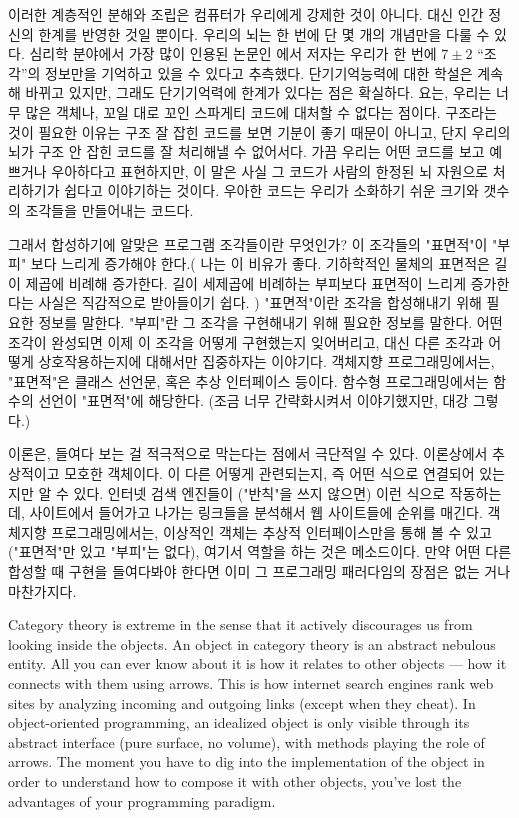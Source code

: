 이러한 계층적인 분해와 조립은 컴퓨터가 우리에게 강제한 것이 아니다.
대신 인간 정신의 한계를 반영한 것일 뿐이다. 우리의 뇌는 한 번에 단 몇 개의 개념만을 다룰 수 있다.
심리학 분야에서 가장 많이 인용된 논문인 
에서 저자는 우리가 한 번에 $7 \pm 2$ ``조각''의 정보만을 기억하고 있을 수 있다고 추측했다.
단기기억능력에 대한 학설은 계속해 바뀌고 있지만, 그래도 단기기억력에 한계가 있다는 점은 확실하다.
요는, 우리는 너무 많은 객체나, 꼬일 대로 꼬인 스파게티 코드에 대처할 수 없다는 점이다.
구조라는 것이 필요한 이유는 구조 잘 잡힌 코드를 보면 기분이 좋기 때문이 아니고,
단지 우리의 뇌가 구조 안 잡힌 코드를 잘 처리해낼 수 없어서다.
가끔 우리는 어떤 코드를 보고 예쁘거나 우아하다고 표현하지만, 이 말은 사실
그 코드가 사람의 한정된 뇌 자원으로 처리하기가 쉽다고 이야기하는 것이다.
우아한 코드는 우리가 소화하기 쉬운 크기와 갯수의 조각들을 만들어내는 코드다.

그래서 합성하기에 알맞은 프로그램 조각들이란 무엇인가?
이 조각들의 "표면적"이 "부피" 보다 느리게 증가해야 한다.(
  나는 이 비유가 좋다. 기하학적인 물체의 표면적은 길이 제곱에 비례해 증가한다.
  길이 세제곱에 비례하는 부피보다 표면적이 느리게 증가한다는 사실은 직감적으로 받아들이기 쉽다.
)
"표면적"이란 조각을 합성해내기 위해 필요한 정보를 말한다.
"부피"란 그 조각을 구현해내기 위해 필요한 정보를 말한다.
어떤 조각이 완성되면 이제 이 조각을 어떻게 구현했는지 잊어버리고,
대신 다른 조각과 어떻게 상호작용하는지에 대해서만 집중하자는 이야기다.
객체지향 프로그래밍에서는, "표면적"은 클래스 선언문, 혹은 추상 인터페이스 등이다.
함수형 프로그래밍에서는 함수의 선언이 "표면적"에 해당한다. (조금 너무 간략화시켜서 이야기했지만, 대강 그렇다.)

\trCategory 이론은,  들여다 보는 걸 적극적으로 막는다는 점에서 극단적일 수 있다.
\trCategory 이론상에서  추상적이고 모호한 객체이다.
이  다른  어떻게 관련되는지, 즉  어떤 식으로 연결되어 있는지만 알 수 있다.
인터넷 검색 엔진들이 ("반칙"을 쓰지 않으면) 이런 식으로 작동하는데, 
사이트에서 들어가고 나가는 링크들을 분석해서 웹 사이트들에 순위를 매긴다.
객체지향 프로그래밍에서는, 이상적인 객체는 추상적 인터페이스만을 통해 볼 수 있고("표면적"만 있고 "부피"는 없다),
여기서  역할을 하는 것은 메소드이다. 
만약 어떤  다른  합성할 때  구현을 들여다봐야 한다면
이미 그 프로그래밍 패러다임의 장점은 없는 거나 마찬가지다.

Category theory is extreme in the sense that it actively discourages us
from looking inside the objects. An object in category theory is an
abstract nebulous entity. All you can ever know about it is how it
relates to other objects --- how it connects with them using arrows. This
is how internet search engines rank web sites by analyzing incoming and
outgoing links (except when they cheat). In object-oriented programming,
an idealized object is only visible through its abstract interface (pure
surface, no volume), with methods playing the role of arrows. The moment
you have to dig into the implementation of the object in order to
understand how to compose it with other objects, you've lost the
advantages of your programming paradigm.

